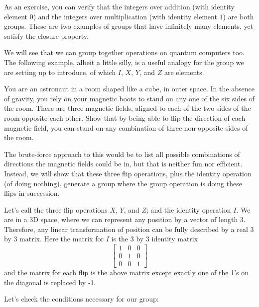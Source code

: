 \documentclass{article}
\theoremstyle{definition}
\begin{document}
As an exercise, you can verify that the integers over addition (with identity element $0$) and the integers over multiplication (with identity element $1$) are both groups.  These are two examples of groups that have infinitely many elements, yet satisfy the closure property.

We will see that we can group together operations on quantum computers too.  The following example, albeit a little silly, is a useful analogy for the group we are setting up to introduce, of which $I$, $X$, $Y$, and $Z$ are elements.

\begin{example}
	\label{ex:groupfirstex}
	You are an astronaut in a room shaped like a cube, in outer space.  In the absence of gravity, you rely on your magnetic boots to stand on any one of the six sides of the room.  There are three magnetic fields, aligned to each of the two sides of the room opposite each other.  Show that by being able to flip the direction of each magnetic field, you can stand on any combination of three non-opposite sides of the room.
	
	\textnormal{The brute-force approach to this would be to list all possible combinations of directions the magnetic fields could be in, but that is neither fun nor efficient.  Instead, we will show that these three flip operations, plus the identity operation (of doing nothing), generate a group where the group operation is doing these flips in succession.}
	
	\textnormal{Let's call the three flip operations $X$, $Y$, and $Z$; and the identity operation $I$.  We are in a 3D space, where we can represent any position by a vector of length 3.  Therefore, any linear transformation of position can be fully described by a real 3 by 3 matrix.  Here the matrix for $I$ is the 3 by 3 identity matrix}
	\begin{equation*}
		\begin{bmatrix}
			1 & 0 & 0\\
			0 & 1 & 0\\
			0 & 0 & 1
		\end{bmatrix}
	\end{equation*}	
	\textnormal{and the matrix for each flip is the above matrix except exactly one of the 1's on the diagonal is replaced by -1.}
	
	\textnormal{Let's check the conditions necessary for our group:}


\end{example}
\end{document}
